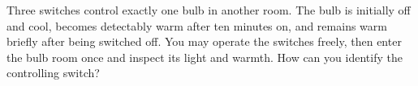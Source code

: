 Three switches control exactly one bulb in another room. The bulb is initially off and cool, becomes detectably warm after ten minutes on, and remains warm briefly after being switched off. You may operate the switches freely, then enter the bulb room once and inspect its light and warmth. How can you identify the controlling switch?
